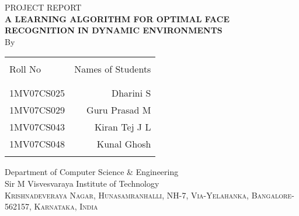 
\begin{titlepage}
\begin{center}

\textup{\Large PROJECT REPORT}\\[0.5cm]

\uppercase{\Large \textbf {A Learning Algorithm for Optimal Face Recognition in Dynamic Environments}}\\[3.0cm]

\vspace{1.0cm}
\normalsize By \\
\begin{table}[h]
\centering
\begin{tabular}{lr}\hline \\
Roll No & Names of Students \\ \\ \hline
\\
1MV07CS025 & Dharini S \\
1MV07CS029 & Guru Prasad M \\
1MV07CS043 & Kiran Tej J L \\
1MV07CS048 & Kunal Ghosh \\ \\ \hline 
\end{tabular}
\end{table}

\vfill

\normalsize

\Large{Department of Computer Science & Engineering}\\
\LARGE{Sir M Visvesvaraya Institute of Technology }\\
\normalsize
\textsc{Krishnadeveraya Nagar, Hunasamranhalli, NH-7,
Via-Yelahanka, Bangalore-562157, Karnataka, India}\\

\vspace{0.5cm}


\end{center}

\end{titlepage}
